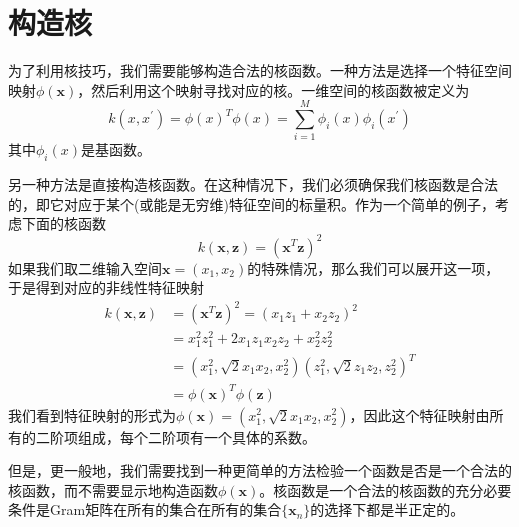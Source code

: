 \section{构造核}
为了利用核技巧，我们需要能够构造合法的核函数。一种方法是选择一个特征空间映射$\phi(\boldsymbol{x})$，然后利用这个映射寻找对应的核。一维空间的核函数被定义为
\begin{equation}
	k(x,x^{'})=\phi(x)^T\phi(x)=\sum_{i=1}^{M}\phi_i(x)\phi_i(x^{'})
\end{equation}
其中$\phi_i(x)$是基函数。

另一种方法是直接构造核函数。在这种情况下，我们必须确保我们核函数是合法的，即它对应于某个(或能是无穷维)特征空间的标量积。作为一个简单的例子，考虑下面的核函数
\begin{equation}
	k(\boldsymbol{x},\boldsymbol{z})=(\boldsymbol{x}^T\boldsymbol{z})^2
\end{equation}
如果我们取二维输入空间$\boldsymbol{x}=(x_1,x_2)$的特殊情况，那么我们可以展开这一项，于是得到对应的非线性特征映射 
\begin{equation}
	\begin{aligned}
	k(\boldsymbol{x},\boldsymbol{z})&=(\boldsymbol{x}^T\boldsymbol{z})^2=(x_1z_1+x_2z_2)^2\\
	&=x_1^2z_1^2+2x_1z_1x_2z_2+x_2^2z_2^2\\
	&=(x_1^2,\sqrt{2}x_1x_2,x_2^2)(z_1^2,\sqrt{2}z_1z_2,z_2^2)^T\\
	&=\phi(\boldsymbol{x})^T\phi(\boldsymbol{z})
	\end{aligned}
\end{equation}
我们看到特征映射的形式为$\phi(\boldsymbol{x})=(x_1^2,\sqrt{2}x_1x_2,x_2^2)$，因此这个特征映射由所有的二阶项组成，每个二阶项有一个具体的系数。

但是，更一般地，我们需要找到一种更简单的方法检验一个函数是否是一个合法的核函数，而不需要显示地构造函数$\phi(\boldsymbol{x})$。核函数是一个合法的核函数的充分必要条件是Gram矩阵在所有的集合在所有的集合$\{\boldsymbol{x}_n \}$的选择下都是半正定的。

